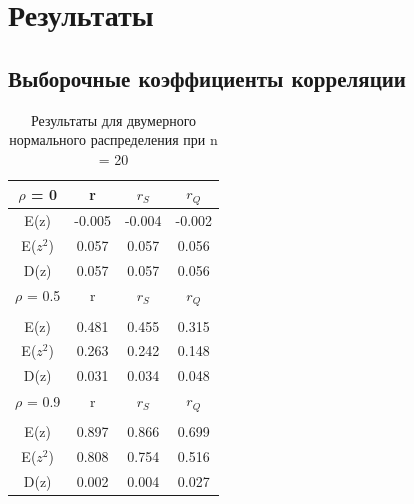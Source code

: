 \documentclass[a4]{article}
\begin{document}
	\section{Результаты}
		\subsection{Выборочные коэффициенты корреляции}
		\begin{table}[h!]
			
			\caption{Результаты для двумерного нормального распределения при  n = 20}
			\label{tab:my_label}
			\begin{center}
				\vspace{5mm}
				\begin{tabular}{|c|c|c|c}
					\hline
					$\rho$ = 0 & r & $r_S$ & $r_Q$ \\
					\hline
					E(z) & -0.005 & -0.004 & -0.002\\
					\hline
					E($z^2$)   & 0.057 & 0.057 & 0.056\\
					\hline
					D(z)   & 0.057 & 0.057 & 0.056 \\
					\hline
					$\rho$ = 0.5 & r & $r_S$ & $r_Q$ \\
					\hline\\
					\hline
					E(z) & 0.481 & 0.455 & 0.315\\
					\hline
					E($z^2$)   & 0.263 & 0.242 & 0.148\\
					\hline
					D(z)   & 0.031 & 0.034 & 0.048 \\
					\hline
					$\rho$ = 0.9 & r & $r_S$ & $r_Q$ \\
					\hline\\
					\hline
					E(z) & 0.897 & 0.866 & 0.699\\
					\hline
					E($z^2$)   & 0.808 & 0.754 & 0.516\\
					\hline
					D(z)   & 0.002 & 0.004 & 0.027 \\
					\hline
				\end{tabular}
				
			\end{center}
			
		\end{table}
		
\end{document}
